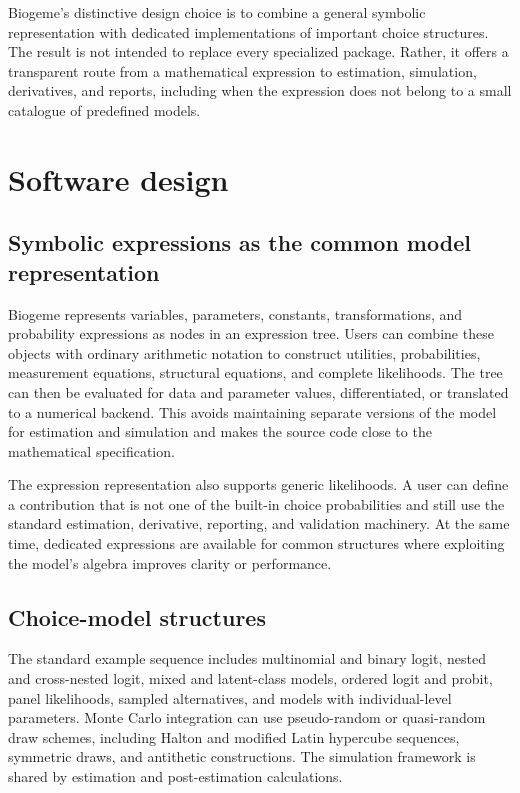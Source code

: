 \documentclass[11pt]{article}
\begin{document}
Biogeme's distinctive design choice is to combine a general symbolic
representation with dedicated implementations of important choice structures.
The result is not intended to replace every specialized package. Rather, it
offers a transparent route from a mathematical expression to estimation,
simulation, derivatives, and reports, including when the expression does not
belong to a small catalogue of predefined models.

\section{Software design}

\subsection{Symbolic expressions as the common model representation}

Biogeme represents variables, parameters, constants, transformations, and
probability expressions as nodes in an expression tree. Users can combine these
objects with ordinary arithmetic notation to construct utilities, probabilities,
measurement equations, structural equations, and complete likelihoods. The
tree can then be evaluated for data and parameter values, differentiated, or
translated to a numerical backend. This avoids maintaining separate versions
of the model for estimation and simulation and makes the source code close to
the mathematical specification.

The expression representation also supports generic likelihoods. A user can
define a contribution that is not one of the built-in choice probabilities and
still use the standard estimation, derivative, reporting, and validation
machinery. At the same time, dedicated expressions are available for common
structures where exploiting the model's algebra improves clarity or
performance.

\subsection{Choice-model structures}

The standard example sequence includes multinomial and binary logit, nested and
cross-nested logit, mixed and latent-class models, ordered logit and probit,
panel likelihoods, sampled alternatives, and models with individual-level
parameters. Monte Carlo integration can use pseudo-random or quasi-random draw
schemes, including Halton and modified Latin hypercube sequences, symmetric
draws, and antithetic constructions. The simulation framework is shared by
estimation and post-estimation calculations.
\end{document}
